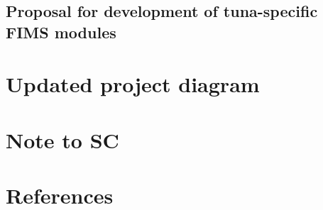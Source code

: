 \documentclass{SCreport}
\begin{document}
\subsection{Proposal for development of tuna-specific FIMS modules}

\section{Updated project diagram}

\section{Note to SC}

\section{References}

\sloppy\setlength{}
\end{document}
